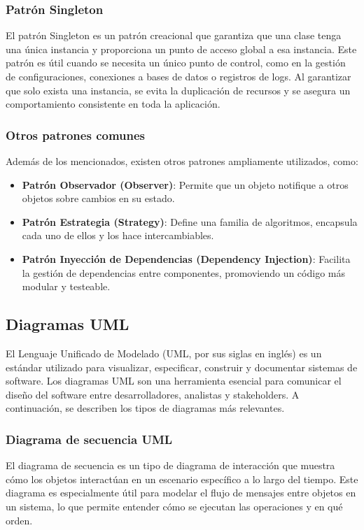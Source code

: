 \documentclass[draft]{scrbook}
\begin{document}
\subsubsection{Patrón Singleton}
El patrón Singleton es un patrón creacional que garantiza que una clase tenga una única instancia y proporciona un punto de acceso global a esa instancia. Este patrón es útil cuando se necesita un único punto de control, como en la gestión de configuraciones, conexiones a bases de datos o registros de logs. Al garantizar que solo exista una instancia, se evita la duplicación de recursos y se asegura un comportamiento consistente en toda la aplicación.

\subsubsection{Otros patrones comunes}
Además de los mencionados, existen otros patrones ampliamente utilizados, como:
\begin{itemize}
    \item \textbf{Patrón Observador (Observer)}: Permite que un objeto notifique a otros objetos sobre cambios en su estado.
    \item \textbf{Patrón Estrategia (Strategy)}: Define una familia de algoritmos, encapsula cada uno de ellos y los hace intercambiables.
    \item \textbf{Patrón Inyección de Dependencias (Dependency Injection)}: Facilita la gestión de dependencias entre componentes, promoviendo un código más modular y testeable.
\end{itemize}

\subsection{Diagramas UML}
 El Lenguaje Unificado de Modelado (UML, por sus siglas en inglés) es un estándar utilizado para visualizar, especificar, construir y documentar sistemas de software. Los diagramas UML son una herramienta esencial para comunicar el diseño del software entre desarrolladores, analistas y stakeholders. A continuación, se describen los tipos de diagramas más relevantes.

\subsubsection{Diagrama de secuencia UML}
El diagrama de secuencia es un tipo de diagrama de interacción que muestra cómo los objetos interactúan en un escenario específico a lo largo del tiempo. Este diagrama es especialmente útil para modelar el flujo de mensajes entre objetos en un sistema, lo que permite entender cómo se ejecutan las operaciones y en qué orden.
\end{document}

